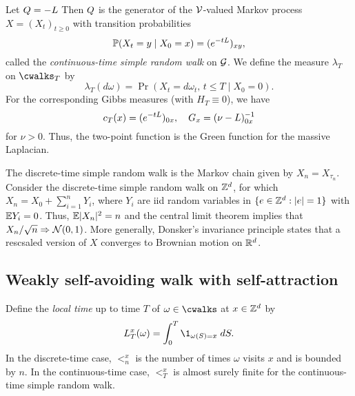 Let $Q = -L$
Then $Q$ is the generator of the $\mathcal{V}$-valued Markov process
$X = (X_t)_{t \ge 0}$ with transition probabilities
\begin{equation}
\operatorname{\mathbb{P}}(X_t = y \mid X_0 = x) = (e^{-t L})_{xy},
\end{equation}
called the \emph{continuous-time simple random walk} on $\mathcal{G}$.
We define the measure $\lambda_T$ on $\cwalks_T$ by
\begin{equation}
\lambda_T(d\omega) = \Pr(X_t = d\omega_t, \, t \le T \mid X_0 = 0).
\end{equation}
For the corresponding Gibbs measures (with $H_T \equiv 0$), we have
\begin{equation}
c_T(x) = (e^{-t L})_{0x},
  \quad
G_x = (\nu - L)^{-1}_{0x}
\end{equation}
for $\nu > 0$. Thus, the two-point function is the Green function for the
massive Laplacian.

\begin{example}
The discrete-time simple random walk is the Markov chain given by
$X_n = X_{\tau_n}$. Consider the discrete-time simple random walk on ${ {{\mathbb Z}}^d }$,
for which $X_n = X_0 + \sum_{i=1}^n Y_i$, where $Y_i$ are iid random variables
in $\{ e \in { {{\mathbb Z}}^d } : |e| = 1 \}$ with $\mathbb{E} Y_i = 0$. Thus, $\mathbb{E} |X_n|^2 = n$ and
the central limit theorem implies that
$X_n / \sqrt n \Rightarrow \mathcal{N}(0, 1)$. More generally, Donsker's invariance
principle states that a rescsaled version of $X$ converges to Brownian motion on ${ {{\mathbb R}}^d}$.
\end{example}


\subsection{Weakly self-avoiding walk with self-attraction}

Define the \emph{local time} up to time $T$ of $\omega \in \cwalks$ at
$x \in { {{\mathbb Z}}^d }$ by
\begin{equation}
\lt^x_T(\omega) = \int_0^T \1_{\omega(S)=x} \; dS.
\end{equation}
In the discrete-time case, $\lt^x_n$ is the number of times $\omega$ visits $x$
and is bounded by $n$. In the continuous-time case, $\lt^x_T$ is almost surely
finite for the continuous-time simple random walk.


